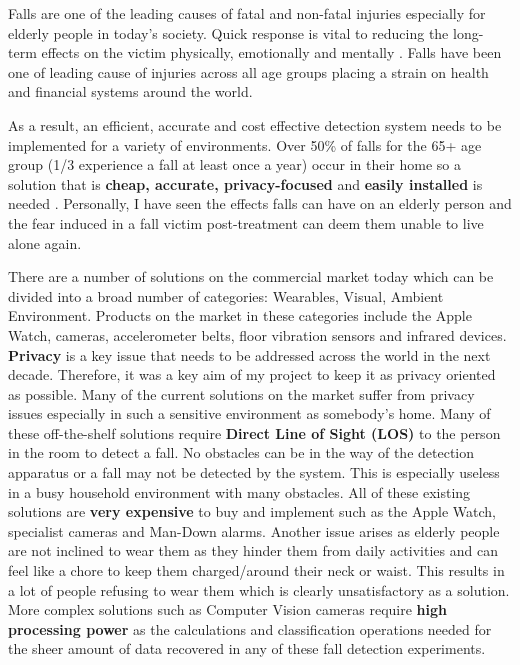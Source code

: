 Falls are one of the leading causes of fatal and non-fatal injuries especially for elderly people in today's society. Quick response is vital to reducing the long-term effects on the victim physically, emotionally and mentally \citep{dangerousFalls,stokesFall}. Falls have been one of leading cause of injuries across all age groups placing a strain on health and financial systems around the world. \par
As a result, an efficient, accurate and cost effective detection system needs to be implemented for a variety of environments. Over 50\% of falls for the 65+ age group (1/3 experience a fall at least once a year) occur in their home so a solution that is \textbf{cheap, accurate, privacy-focused} and \textbf{easily installed} is needed \citep{medicalFall, stokesFall}. 
Personally, I have seen the effects falls can have on an elderly person and the fear induced in a fall victim post-treatment can deem them unable to live alone again. \citep{fearFall} \par
There are a number of solutions on the commercial market today which can be divided into a broad number of categories: Wearables, Visual, Ambient Environment. Products on the market in these categories include the Apple Watch, cameras, accelerometer belts, floor vibration sensors and infrared devices. \textbf{Privacy} is a key issue that needs to be addressed across the world in the next decade. Therefore, it was a key aim of my project to keep it as privacy oriented as possible. Many of the current solutions on the market suffer from privacy issues especially in such a sensitive environment as somebody's home. Many of these off-the-shelf solutions require \textbf{Direct Line of Sight (LOS)} to the person in the room to detect a fall. No obstacles can be in the way of the detection apparatus or a fall may not be detected by the system. This is especially useless in a busy household environment with many obstacles. All of these existing solutions are \textbf{very expensive} to buy and implement such as the Apple Watch, specialist cameras and Man-Down alarms. Another issue arises as elderly people are not inclined to wear them as they hinder them from daily activities and can feel like a chore to keep them charged/around their neck or waist. This results in a lot of people refusing to wear them which is clearly unsatisfactory as a solution. More complex solutions such as Computer Vision cameras require \textbf{high processing power} as the calculations and classification operations needed for the sheer amount of data recovered in any of these fall detection experiments. \par
